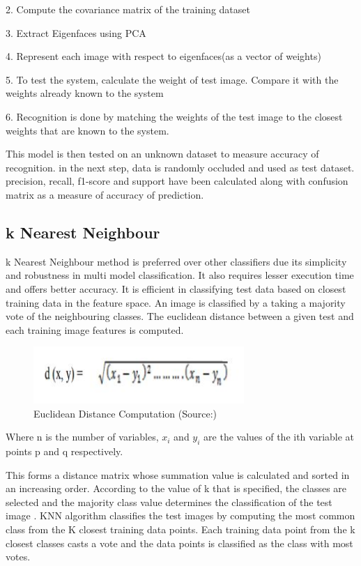 \documentclass[conference]{IEEEtran}
\begin{document}
    
	2. Compute the covariance matrix of the training dataset
    
	3. Extract Eigenfaces using PCA
	
    4. Represent each image with respect to eigenfaces(as a vector of weights)

5. To test the system, calculate the weight of test image. Compare it with the weights already known to the system

6. Recognition is done by matching the weights of the test image to the closest weights that are known to the system. 

This model is then tested on an unknown dataset to measure accuracy of recognition. in the next step, data is randomly occluded and used as test dataset. precision, recall, f1-score and support have been calculated along with confusion matrix as a measure of accuracy of prediction. 


\subsection{k Nearest Neighbour}
\label{subsec:3.2 k Nearest Neighbour}
k Nearest Neighbour method is preferred over other classifiers due its simplicity and robustness in multi model classification. It also requires lesser execution time and offers better accuracy. It is efficient in classifying test data based on closest training data in the feature space. An image is classified by a taking a majority vote of the neighbouring classes. The euclidean distance between a given test and each training image features is computed. 

\begin{figure}[h!]
 \centering
 \includegraphics[width = 8cm]{euclidean_distance11.JPG}
 \caption{Euclidean Distance Computation (Source:\cite{weinberger2006distance})}
 \label{fig 4 : Euclidean Distance}
\end{figure}

Where n is the number of variables, $x_i$ and $y_i$ are the values of the ith variable at points p and q respectively. 

This forms a distance matrix whose summation value is calculated and sorted in an increasing order. According to the value of k that is specified, the classes are selected and the majority class value determines the classification of the test image \cite{kaur2012k}. KNN algorithm classifies the test images by computing the most common class from the K closest training data points. Each training data point from the k closest classes casts a vote and the data points is classified as the class with most votes.
\end{document}
